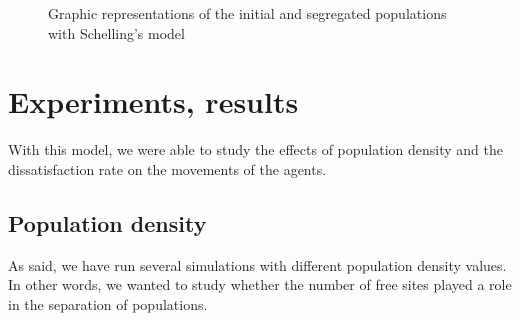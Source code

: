 \documentclass[a4paper, 12pt]{report}
\begin{document}
\begin{figure}[!h]

	\centering
	\centering
	\caption{Graphic representations of the initial and segregated populations with Schelling's model}

\end{figure}

\newpage

\section{Experiments, results}

With this model, we were able to study the effects of population density and the dissatisfaction rate on the movements of
the agents.

\subsection{Population density}

As said, we have run several simulations with different population density values. In other words,
we wanted to study whether the number of free sites played a role in the separation of populations.

\vspace{0.7cm}
\end{document}
